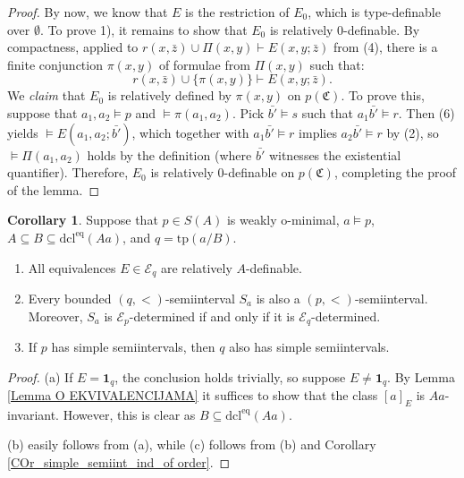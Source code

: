 \documentclass{amsart}
\theoremstyle{definition}
\newtheorem{Corollary}[Theorem]{Corollary}
\theoremstyle{definition}
\newcommand{\Mon}{\mathfrak C}
\newcommand{\tp}{\mathrm{tp}}
\newcommand{\dcleq}{\mathrm{dcl^{eq}}}
\begin{document}
\begin{proof}
By now, we know that $E$ is the restriction of $E_0$, which is type-definable over $\emptyset$. To prove 1), it remains to show that $E_0$ is relatively 0-definable. 
By compactness, applied to $r(x,\bar z)\cup\Pi(x,y)\vdash E(x,y;\bar z)$ from (4),  there is a finite conjunction $\pi(x,y)$ of formulae from $\Pi(x,y)$ such that: 
\begin{equation}\tag{6}
    r(x,\bar z)\cup \{\pi(x,y)\}\vdash E(x,y;\bar z).
\end{equation}
We {\em claim} that $E_0$ is relatively defined by $\pi(x,y)$ on $p(\Mon)$. To prove this, suppose that $a_1,a_2\models p$ and $\models\pi(a_1,a_2)$. Pick $\bar{b'}\models s$ such that $a_1\bar{b'}\models r$. Then (6) yields $\models E(a_1,a_2;\bar{b'})$, which together with $a_1\bar{b'}\models r$ implies $a_2\bar{b'}\models r$ by (2), so $\models \Pi(a_1,a_2)$ holds by the definition (where $\bar{b'}$ witnesses the existential quantifier). Therefore, $E_0$ is relatively 0-definable on $p(\Mon)$, completing the proof of the lemma.
\end{proof}


\begin{Corollary}\label{Fact_imaginaries_Epqdetermined_semiintervals}
Suppose that $p\in S(A)$ is weakly o-minimal, $a\models p$, $A\subseteq B\subseteq \dcleq(Aa)$, and $q=\tp(a/B)$. 
\begin{enumerate}[\hspace{10pt}(a)]
\item All equivalences $E\in\mathcal E_q$ are relatively $A$-definable. 
\item Every bounded $(q,<)$-semiinterval $S_a$ is also a $(p,<)$-semiinterval. Moreover, $S_a$ is $\mathcal E_p$-determined if and only if it is $\mathcal E_{q}$-determined. 
\item If $p$ has simple semiintervals, then $q$ also has simple semiintervals. 
\end{enumerate}
\end{Corollary}
\begin{proof}(a) If $E=\mathbf 1_q$, the conclusion holds trivially, so suppose $E\neq\mathbf 1_q$.
By Lemma \ref{Lemma O EKVIVALENCIJAMA} it suffices to show that the class $[a]_E$ is $Aa$-invariant. However, this is clear as $B\subseteq\dcleq(Aa)$. 

(b) easily follows from (a), while (c) follows from (b) and Corollary \ref{COr_simple_semiint_ind_of order}. 
\end{proof}
\end{document}
